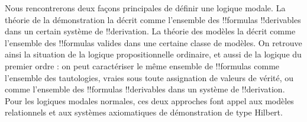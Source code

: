 \documentclass[../../../include/open-logic-section]{subfiles}
\begin{document}
Nous rencontrerons deux façons principales de définir une logique
modale. La théorie de la démonstration la décrit comme l'ensemble
des !!{formula}s !!{derivable}s dans un certain système de
!!{derivation}. La théorie des modèles la décrit comme l'ensemble
des !!{formula}s valides dans une certaine classe de modèles.
On retrouve ainsi la situation de la logique propositionnelle
ordinaire, et aussi de la logique du premier ordre : on peut
caractériser le même ensemble de !!{formula}s comme l'ensemble des
tautologies, vraies sous toute assignation de valeurs de vérité,
ou comme l'ensemble des !!{formula}s !!{derivable}s dans un système
de !!{derivation}. Pour les logiques modales normales, ces deux
approches font appel aux modèles relationnels et aux systèmes
axiomatiques de démonstration de type Hilbert.
\end{document}

